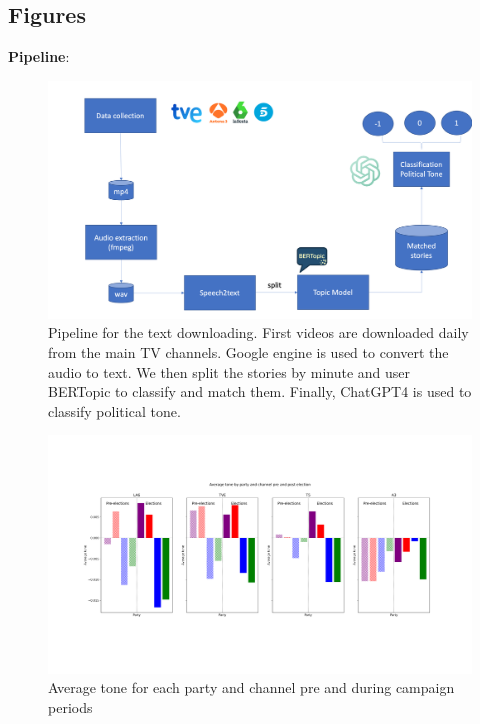 \documentclass[12pt]{article}
\begin{document}
\subsection{Figures}



\textbf{Pipeline}:

\begin{figure}[H]
	\centering
	\includegraphics[width=150mm]{figures/pipeline3}
	\caption{Pipeline for the text downloading. First videos are downloaded daily from the main TV channels. Google engine is used to convert the audio to text. We then split the stories by minute and user BERTopic to classify and match them. Finally, ChatGPT4 is used to classify political tone.}
		\label{fig:pipeline}
\end{figure}


\begin{figure}[H]
	\centering
	\includegraphics[width=150mm]{figures/average_tone_pre_post_election.png}
	\caption{Average tone for each party and channel pre and during campaign periods}
	\label{fig:party_decomposition}
\end{figure}
\end{document}
